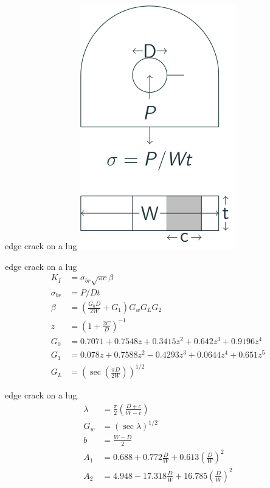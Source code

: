 \documentclass[
  letterpaper,
  ignorenonframetext,
  aspectratio=43,
  handout,
  12pt]{beamer}
\let\Oldincludegraphics\includegraphics
\renewcommand{\includegraphics}[2][]{\Oldincludegraphics[width=\textwidth,height=0.7\textheight,keepaspectratio]{#2}}
\begin{document}
\begin{frame}{edge crack on a lug}
\protect\hypertarget{edge-crack-on-a-lug}{}
\includegraphics{../images/bearing-single.svg}
\end{frame}

\begin{frame}{edge crack on a lug}
\protect\hypertarget{edge-crack-on-a-lug-1}{}
\[\begin{aligned}
  K_I &= \sigma_{br} \sqrt{\pi c} \beta\\
  \sigma_{br} &= P/Dt\\
  \beta &= \left(\frac{G_0 D}{2W} + G_1\right)G_w G_L G_2\\
  z &= \left(1+\frac{2C}{D}\right)^{-1}\\
  G_0 &= 0.7071 + 0.7548z + 0.3415z^2 + 0.642z^3 + 0.9196z^4\\
  G_1 &= 0.078z + 0.7588z^2 - 0.4293z^3 + 0.0644z^4 + 0.651z^5\\
  G_L &= \left(\sec \left(\frac{\pi D}{2W}\right)\right)^{1/2}
\end{aligned}\]
\end{frame}

\begin{frame}{edge crack on a lug}
\protect\hypertarget{edge-crack-on-a-lug-2}{}
\[\begin{aligned}
  \lambda &= \frac{\pi}{2} \left(\frac{D+c}{W-c}\right)\\
  G_w &= \left(\sec \lambda \right)^{1/2}\\
  b &= \frac{W-D}{2}\\
  A_1 &= 0.688 + 0.772 \frac{D}{W} + 0.613 \left(\frac{D}{W}\right)^2\\
  A_2 &= 4.948 - 17.318 \frac{D}{W} + 16.785 \left(\frac{D}{W}\right)^2
\end{aligned}\]
\end{frame}
\end{document}
